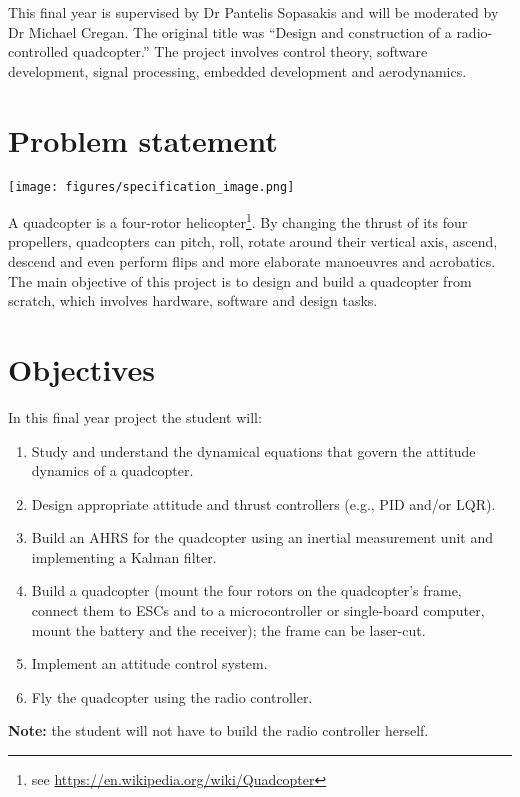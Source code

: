 This final year is supervised by Dr Pantelis Sopasakis and will be moderated by Dr Michael Cregan. The original title was ``Design and construction of a radio-controlled quadcopter.''
The project involves control theory, software development, signal processing, embedded development and aerodynamics.

\section*{Problem statement}
\begin{minipage}[t]{0.4\textwidth}\vspace{0em}
    \centering
    \texttt{[image: figures/specification\_image.png]}
\end{minipage}
\begin{minipage}[t]{0.595\textwidth}\vspace{0em}
A quadcopter is a four-rotor helicopter\footnote{see \url{https://en.wikipedia.org/wiki/Quadcopter}}. By changing the thrust of its four propellers, quadcopters can pitch, roll, rotate around their vertical axis, ascend, descend and even perform flips and more elaborate manoeuvres and acrobatics. The main objective of this project is to design and build a quadcopter from scratch, which involves hardware, software and design tasks.
\end{minipage}

\section*{Objectives}
In this final year project the student will:
\begin{enumerate}
    \setlength\itemsep{-0.5em}
    \item Study and understand the dynamical equations that govern the attitude dynamics of a quadcopter.
    \item Design appropriate attitude and thrust controllers (e.g., PID and/or \acs{LQR}).
    \item Build an \ac{AHRS} for the quadcopter using an inertial measurement unit and implementing a Kalman filter.
    \item Build a quadcopter (mount the four rotors on the quadcopter's frame, connect them to ESCs and to a microcontroller or single-board computer, mount the battery and the receiver); the frame can be laser-cut. 
    \item Implement an attitude control system.
    \item Fly the quadcopter using the radio controller.
\end{enumerate}
\textbf{Note: } the student will not have to build the radio controller herself.

